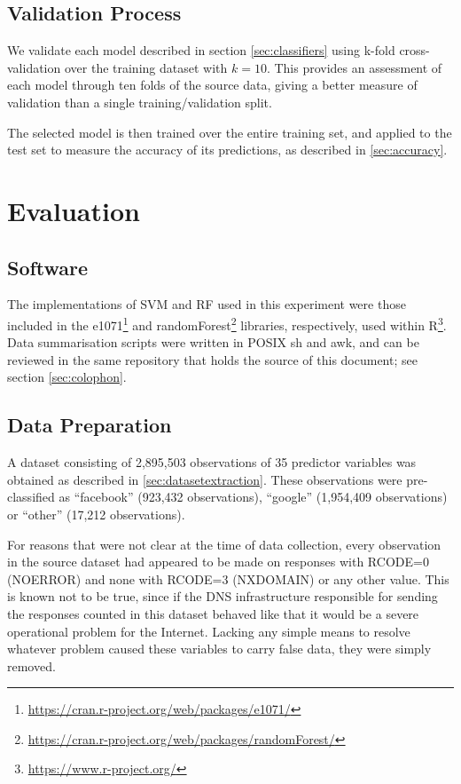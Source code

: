 \documentclass[conference]{IEEEtran}
\begin{document}
\subsection{Validation Process}\label{sec:validation-process}

We validate each model described in section \ref{sec:classifiers} using
k-fold cross-validation over the training dataset with \(k=10\). This
provides an assessment of each model through ten folds of the source
data, giving a better measure of validation than a single
training/validation split.

The selected model is then trained over the entire training set, and
applied to the test set to measure the accuracy of its predictions, as
described in \ref{sec:accuracy}.

\section{Evaluation}\label{sec:evaluation}

\label{sec:evaluation}

\subsection{Software}\label{sec:software}

The implementations of SVM and RF used in this experiment were those
included in the
e1071\footnote{\url{https://cran.r-project.org/web/packages/e1071/}} and
randomForest\footnote{\url{https://cran.r-project.org/web/packages/randomForest/}}
libraries, respectively, used within
R\footnote{\url{https://www.r-project.org/}}. Data summarisation scripts
were written in POSIX sh and awk, and can be reviewed in the same
repository that holds the source of this document; see section
\ref{sec:colophon}.

\subsection{Data Preparation}\label{sec:data-preparation}

A dataset consisting of 2,895,503 observations of 35 predictor variables
was obtained as described in \ref{sec:datasetextraction}. These
observations were pre-classified as ``facebook'' (923,432 observations),
``google'' (1,954,409 observations) or ``other'' (17,212 observations).

For reasons that were not clear at the time of data collection, every
observation in the source dataset had appeared to be made on responses
with RCODE=0 (NOERROR) and none with RCODE=3 (NXDOMAIN) or any other
value. This is known not to be true, since if the DNS infrastructure
responsible for sending the responses counted in this dataset behaved
like that it would be a severe operational problem for the Internet.
Lacking any simple means to resolve whatever problem caused these
variables to carry false data, they were simply removed.
\end{document}
